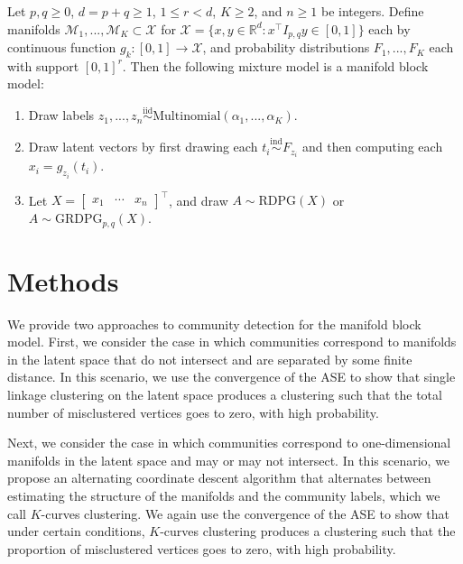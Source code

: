 \documentclass[12pt]{article}
\begin{document}
\begin{definition}
Let $p, q \geq 0$, $d = p + q \geq 1$, $1 \leq r < d$, $K \geq 2$, and $n \geq 1$ be integers.
Define manifolds $\mathcal{M}_1, ..., \mathcal{M}_K \subset \mathcal{X}$ for $\mathcal{X} = \{x, y \in \mathbb{R}^d : x^\top I_{p,q} y \in [0, 1] \}$ each by continuous function $g_k : [0, 1] \to \mathcal{X}$, 
and probability distributions $F_1, ..., F_K$ each with support $[0, 1]^r$. 
Then the following mixture model is a manifold block model: 

\begin{enumerate}
  \item Draw labels $z_1, ..., z_n \stackrel{\mathrm{iid}}{\sim}\mathrm{Multinomial}(\alpha_1, ..., \alpha_K)$. 
  \item Draw latent vectors by first drawing each $t_i \stackrel{\mathrm{ind}}{\sim}F_{z_i}$ and then computing each $x_i = g_{z_i}(t_i)$. 
  \item Let $X = \begin{bmatrix} x_1 & \cdots & x_n \end{bmatrix}^\top$, and draw $A \sim \mathrm{RDPG}(X)$ or $A \sim \mathrm{GRDPG}_{p,q}(X)$. 
\end{enumerate}
\end{definition}

\hypertarget{methods}{%
\section{Methods}\label{methods}}

We provide two approaches to community detection for the manifold block
model. First, we consider the case in which communities correspond to
manifolds in the latent space that do not intersect and are separated by
some finite distance. In this scenario, we use the convergence of the
ASE to show that single linkage clustering on the latent space produces
a clustering such that the total number of misclustered vertices goes to
zero, with high probability.

Next, we consider the case in which communities correspond to
one-dimensional manifolds in the latent space and may or may not
intersect. In this scenario, we propose an alternating coordinate
descent algorithm that alternates between estimating the structure of
the manifolds and the community labels, which we call \(K\)-curves
clustering. We again use the convergence of the ASE to show that under
certain conditions, \(K\)-curves clustering produces a clustering such
that the proportion of misclustered vertices goes to zero, with high
probability.
\end{document}

